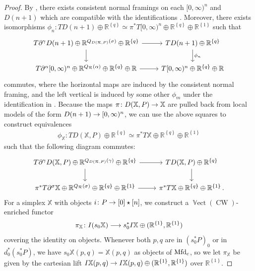 \documentclass[10pt]{amsart}
\numberwithin{equation}{section}
\theoremstyle{definition}
\DeclareMathOperator{\bVect}{\mathbb{V}ect}
\DeclareMathOperator{\CW}{CW}
\newcommand{\Mfd}{\mathrm{Mfd}\vphantom{d}}
\newcommand{\bR}{\mathbb{R}}
\newcommand{\bX}{\mathbb{X}}
\newcommand{\cR}{\mathcal{R}}
\newcommand{\del}{\partial}
\newcommand{\join}{\star}
\renewcommand{\to}{\mathchoice{\longrightarrow}{\rightarrow}{}{}}
\begin{document}
\begin{proof}
		By \cite[Lemma 6.11]{AB}, there exists consistent normal framings on each $[0,\infty)^{n}$ and $D(n+1)$ which are compatible with the identifications .
    Moreover, there exists isomorphisms $\phi_{n}\colon TD(n+1) \oplus \bR^{ \left\{ q\right\}} \simeq \pi^{*}T[0,\infty)^{n} \oplus \bR^{ \left\{ q\right\}} \oplus \bR^{ \left\{ 1\right\} }$ such that
	\begin{equation*}
		\begin{tikzcd}
			T \del^{\gamma} D(n+1) \oplus \bR^{Q_{D(\cR,P)}(\sigma)} \oplus \bR^{ \left\{ q\right\}} \arrow[r] \arrow[d]      &   T D(n+1) \oplus \bR^{ \left\{ q\right\}} \arrow[d, "\phi_{n}"] \\
			T \del^{\alpha} [0,\infty)^{n} \oplus \bR^{Q_{\cR}(\alpha)} \oplus \bR^{ \left\{ q\right\}} \oplus \bR  \arrow[r]               &   T [0,\infty)^{n} \oplus \bR^{ \left\{ q\right\}} \oplus \bR
		\end{tikzcd}
	\end{equation*}
	commutes, where the horizontal maps are induced by the consistent normal framing, and the left vertical is induced by some other $\phi_{m}$ under the identification in .
	Because the maps $\pi\colon D(\bX, P) \to \bX$ are pulled back from local models of the form $D(n+1) \to [0,\infty)^{n}$, we can use the above squares to construct equivalences
	\begin{align}\label{eq:phi_X}
		\phi_{\bX}\colon TD(\bX, P) \oplus \bR^{ \left\{ q\right\}} \simeq \pi^{*}T\bX \oplus \bR^{ \left\{ q\right\}}\oplus \bR^{ \left\{ 1\right\}}
	\end{align}
	such that the following diagram commutes:
	\begin{equation}
		\begin{tikzcd}\label{eq:degeneration_is_htpy_eq}
			T \del^{\gamma} D(\bX,P) \oplus \bR^{Q_{D(\cR,P)}(\gamma)} \oplus \bR^{ \left\{ q\right\}} \arrow[r] \arrow[d]      &   T D(\bX, P) \oplus \bR^{ \left\{ q\right\}} \arrow[d] \\
			\pi^{*}T\del^{\sigma}\bX \oplus \bR^{Q_{\cR}(\sigma)} \oplus \bR^{ \left\{ q\right\}} \oplus \bR^{ \left\{ 1\right\}} \arrow[r]               & \pi^{*} T\bX \oplus \bR^{ \left\{ q\right\}} \oplus \bR^{ \left\{ 1\right\}} \,.
		\end{tikzcd}
	\end{equation}
	For a simplex $\bX$ with objects $i\colon P\to [0]\join[n]$, we construct a $\bVect(\CW)$-enriched functor
	\begin{align*}
		\pi_{\bX} \colon I(s_{0}\bX) \to s_{0}^{*}I\bX \oplus (\bR^{ \left\{ 1\right\}},\bR^{ \left\{ 1\right\}})
	\end{align*}
	covering the identity on objects.
  Whenever both $p,q$ are in  $(s_{0}^{*}P)_{0}$ or in $d_{0}^{*}(s_{0}^{*}P)$, we have $s_{0}\bX(p,q)=\bX(p,q)$ as objects of $\Mfd_{c}$, so we let $\pi_{\bX}$ be given by the cartesian lift $I\bX(p,q) \to I\bX(p,q) \oplus (\bR^{ \left\{ 1\right\}},\bR^{ \left\{ 1\right\}})$ over $\bR^{ \left\{ 1\right\}}$.


\end{proof}
\end{document}
